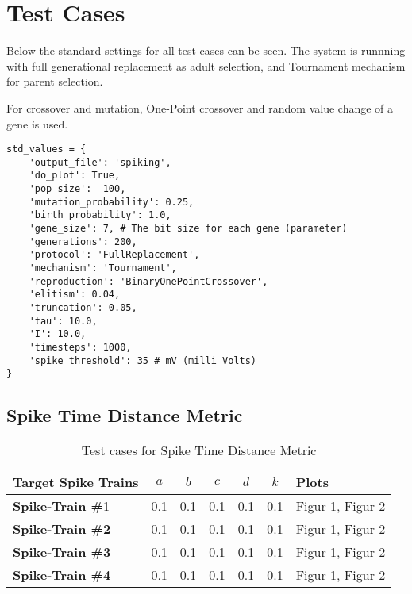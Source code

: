 \section{Test Cases}

Below the standard settings for all test cases can be seen. The system is runnning
with full generational replacement as adult selection, and Tournament mechanism for
parent selection.

For crossover and mutation, One-Point crossover and random value change of a gene is used. 

\begin{lstlisting}[frame=single,caption={Default values for all params}] 
std_values = {
    'output_file': 'spiking',
    'do_plot': True,
    'pop_size':  100,
    'mutation_probability': 0.25,
    'birth_probability': 1.0,
    'gene_size': 7, # The bit size for each gene (parameter)
    'generations': 200,
    'protocol': 'FullReplacement',
    'mechanism': 'Tournament',
    'reproduction': 'BinaryOnePointCrossover',
    'elitism': 0.04,
    'truncation': 0.05,
    'tau': 10.0,
    'I': 10.0,
    'timesteps': 1000,
    'spike_threshold': 35 # mV (milli Volts)
}
\end{lstlisting}

\subsection{Spike Time Distance Metric}

\begin{table}[H]
	\begin{center}
		\begin{tabular}{ | l | c | c | c | c | c | l |}
	
	    \hline
	    
	  	\textbf{Target Spike Trains} & \textbf{$a$} & \textbf{$b$} & \textbf{$c$} & \textbf{$d$} & \textbf{$k$} & \textbf{Plots} \\ \hline
	  	\textbf{Spike-Train \#}1 & 0.1 & 0.1 & 0.1 & 0.1 & 0.1 & Figur 1, Figur 2 \\ \hline
	  	\textbf{Spike-Train \#2} & 0.1 & 0.1 & 0.1 & 0.1 & 0.1 & Figur 1, Figur 2 \\ \hline
	  	\textbf{Spike-Train \#3} & 0.1 & 0.1 & 0.1 & 0.1 & 0.1 & Figur 1, Figur 2 \\ \hline
	  	\textbf{Spike-Train \#4} & 0.1 & 0.1 & 0.1 & 0.1 & 0.1 & Figur 1, Figur 2 \\  \hline
	  	
	    \end{tabular}
	
	\end{center}
    \caption{Test cases for Spike Time Distance Metric}
\end{table}


